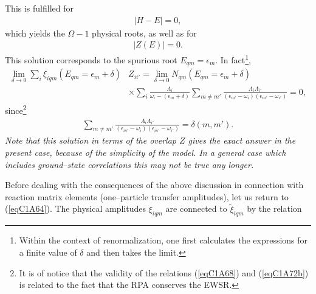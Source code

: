 This is fulfilled for 
\begin{align}\label{eqC1A70} 
 \left|H-E\right|=0,
  \end{align}
  which yields the $\Omega-1$ physical roots, as well as for 
\begin{align}\label{eqC1A71} 
 |Z(E)|=0.
  \end{align}
This solution corresponds to the spurious root $E_{qm}=\epsilon_m$. In fact\footnote{Within the context of renormalization, one first calculates the expressions  for a finite value of $\delta$ and then takes the limit.}, 
\begin{align}\label{eqC1A72} 
\nonumber \lim_{\delta\rightarrow0}\sum_i\xi_{iqm}(E_{qm}=\epsilon_m+\delta)&Z_{ii'}=\lim_{\delta\rightarrow0}N_{qm}(E_{qm}=\epsilon_m+\delta)\\
 &\times\sum_i\frac{\Lambda_i}{\omega_i-(\epsilon_m+\delta)}\sum_{m\neq m'}\frac{\Lambda_i\Lambda_{i'}}{(\epsilon_{m'}-\omega_i)(\epsilon_{m'}-\omega_{i'})}=0,
  \end{align}
  since\footnote{It is of notice that the validity of the relations (\ref{eqC1A68}) and (\ref{eqC1A72b}) is related to the fact that the RPA conserves the EWSR.}
  \begin{align}\label{eqC1A72b} 
  \sum_{m\neq m'}\frac{\Lambda_i\Lambda_{i'}}{(\epsilon_{m'}-\omega_i)(\epsilon_{m'}-\omega_{i'})}=\delta(m,m').
    \end{align} 
\textit{Note that this solution in terms of the overlap $Z$ gives the exact answer in the present case, because of the simplicity of the model. In a general case which includes ground--state correlations this may not be true any longer. }


Before dealing with the consequences of the above discussion in connection with reaction matrix elements (one--particle transfer amplitudes), let us return to (\ref{eqC1A64}).
The physical amplitudes $\xi_{iqm}$ are connected to $\tilde \xi_{iqm}$ by the relation

